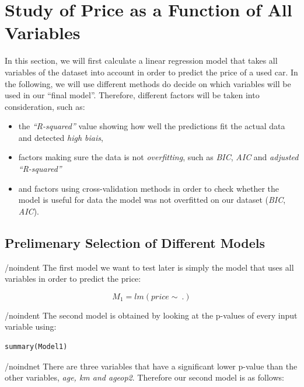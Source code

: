 \section{Study of Price as a Function of All Variables} %
\label{sec:study_of_price_as_a_function_of_all_variables}

In this section, we will first calculate a linear regression model 
that takes all variables of the dataset into account in order to
predict the price of a used car. In the following, we will use different 
methods do decide on which variables will be used in our ``final model''. 
Therefore, different factors will be taken into consideration, such as:

\begin{itemize}
	\item the \emph{``R-squared''} value showing how well the predictions fit the actual data and detected \emph{high biais},
	\item factors making sure the data is not \emph{overfitting}, such as 
	\emph{BIC}, \emph{AIC} and \emph{adjusted ``R-squared''}
	\item and factors using cross-validation methods in order to check 
	whether the model is useful for data the model was not overfitted on our dataset 
	(\emph{BIC}, \emph{AIC}).
\end{itemize}

\subsection{Prelimenary Selection of Different Models} %
\label{sub:prelimenary_selection_of_different_models}

/noindent
The first model we want to test later is simply the model that uses all 
variables in order to predict the price: 

\begin{equation}\label{eq:model1}
	M_1 = lm(price \sim\ .)
\end{equation}

/noindent
The second model is obtained by looking at the p-values of every input 
variable using:

\begin{lstlisting}[caption={summary() in R},label={lst:summary_func}]
	summary(Model1)
\end{lstlisting}

/noindnet
There are three variables that have a significant lower 
p-value than the other variables, \emph{age, km and ageop2}.
Therefore our second model is as follows:

